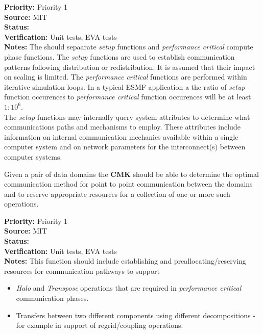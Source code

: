 

\begin{reqlist}
{\bf Priority:} Priority 1 \\
{\bf Source:}  MIT \\
{\bf Status:}  \\
{\bf Verification:} Unit tests, EVA tests \\
{\bf Notes:}
The {\bf \shortname} should sepaarate {\it setup} functions
and {\it performance critical} compute phase functions. The {\it setup}
functions are used to establish communication patterns following
distribution or redistribution. It is assumed that their impact
on scaling is limited. The {\it performance critical} functions
are performed within iterative simulation loops. In a typical
ESMF application a the ratio of {\it setup} function occurences
to {\it performance critical} function occurences will be at least
$1:10^6$.\\
The {\bf \shortname} {\it setup} functions may internally query system attributes 
to determine what communications paths and mechanisms to employ. These
attributes include information on internal communication
mechanics available within a single computer system and on network 
parameters for the interconnect(s) between computer systems.
\end{reqlist}

Given a pair of data domains the {\bf CMK} should be able to determine the
optimal communication method for point to point communication
between the domains and to reserve appropriate resources for a collection of one
or more such operations.
\begin{reqlist}
{\bf Priority:} Priority 1 \\
{\bf Source:}  MIT \\
{\bf Status:}  \\
{\bf Verification:} Unit tests, EVA tests \\
{\bf Notes:}
This function should include establishing and preallocating/reserving 
resources for communication pathways to support
\begin{itemize}
\item {\it Halo} and {\it Transpose} operations that are required in 
{\it performance critical} communication phases.
\item Transfers between two different components using different decompositions -
for example in support of regrid/coupling operations.
\end{itemize}
\end{reqlist}

